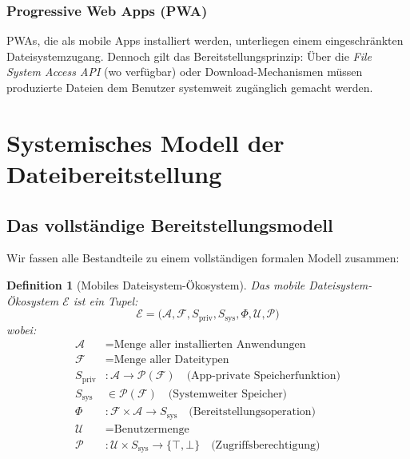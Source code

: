 ﻿\documentclass[12pt, a4paper]{article}
\newtheorem{definition}{Definition}[section]
\begin{document}
\subsubsection{Progressive Web Apps (PWA)}

PWAs, die als mobile Apps installiert werden, unterliegen einem eingeschränkten
Dateisystemzugang. Dennoch gilt das Bereitstellungsprinzip: Über die
\emph{File System Access API} (wo verfügbar) oder Download-Mechanismen
müssen produzierte Dateien dem Benutzer systemweit zugänglich gemacht werden.

\section{Systemisches Modell der Dateibereitstellung}
\label{sec:modell}

\subsection{Das vollständige Bereitstellungsmodell}

Wir fassen alle Bestandteile zu einem vollständigen formalen Modell zusammen:

\begin{definition}[Mobiles Dateisystem-Ökosystem]
Das \emph{mobile Dateisystem-Ökosystem} $\mathcal{E}$ ist ein Tupel:
\[
  \mathcal{E} = \big(\mathcal{A}, \mathcal{F}, S_{\text{priv}}, S_{\text{sys}}, \Phi, \mathcal{U}, \mathcal{P}\big)
\]
wobei:
\begin{align*}
  \mathcal{A} &= \text{Menge aller installierten Anwendungen} \\
  \mathcal{F} &= \text{Menge aller Dateitypen} \\
  S_{\text{priv}} &: \mathcal{A} \to \mathcal{P}(\mathcal{F}) \quad \text{(App-private Speicherfunktion)} \\
  S_{\text{sys}} &\in \mathcal{P}(\mathcal{F}) \quad \text{(Systemweiter Speicher)} \\
  \Phi &: \mathcal{F} \times \mathcal{A} \to S_{\text{sys}} \quad \text{(Bereitstellungsoperation)} \\
  \mathcal{U} &= \text{Benutzermenge} \\
  \mathcal{P} &: \mathcal{U} \times S_{\text{sys}} \to \{\top, \bot\} \quad \text{(Zugriffsberechtigung)}
\end{align*}
\end{definition}
\end{document}
